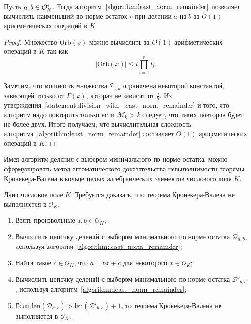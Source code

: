 \documentclass[_00_dissertation.tex]{subfiles}
\begin{document}
\begin{proposition}
    Пусть $a, b \in \mathcal{O}_K^{*}$.
    Тогда алгоритм~$\ref{algorithm:least_norm_remainder}$ позволяет вычислить наименьший по норме остаток $r$ при делении $a$ на $b$ за $O(1)$ арифметических операций в $K$.
\end{proposition}
\begin{proof}
    Множество $\textrm{Orb}(x)$ можно вычислить за $O(1)$ арифметических операций в $K$ так как
    \begin{equation*}
        |\textrm{Orb}(x)| \le l\prod\limits_{i=1}^r l_i.
    \end{equation*}

    Заметим, что мощность множества $\mathcal{I}_{z, k}$ ограничена некоторой константой, зависящей только от $\Gamma(k)$, которая не зависит от $\frac{a}{b}$.
    Из утверждения~\ref{statement:division_with_least_norm_remainder} и того, что алгоритм надо повторить только если $\mathcal{M}_k > k$ следует, что таких повторов будет не более двух.
    Итого получаем, что вычислительная сложность алгоритма~\ref{algorithm:least_norm_remainder} составляет $O(1)$ арифметических операций в $K$.
\end{proof}


Имея алгоритм деления с выбором минимального по норме остатка, можно сформулировать метод автоматического доказательства невыполнимости теоремы Кронекера-Валена в кольце целых алгебраических элементов числового поля $K$.

\begin{algorithm}\label{algorithm:kronecker_vahlen_common}
    Дано числовое поле $K$.
    Требуется доказать, что теорема Кронекера-Валена не выполняется в $\mathcal{O}_K$.
    
    \begin{enumerate}
        \item Взять произвольные $a, b \in \mathcal{O}_K$;

        \item Вычислить цепочку делений с выбором минимального по норме остатка $\mathcal{D}_{a, b}$, используя алгоритм~\ref{algorithm:least_norm_remainder};

        \item Найти такое $c \in \mathcal{O}_K$, что $a = bx + c$ для некоторого $x \in \mathcal{O}_K$;

        \item Вычислить цепочку делений с выбором минимального по норме остатка $\mathcal{D}'_{b,c}$, используя алгоритм~\ref{algorithm:least_norm_remainder};

        \item Если $\textrm{len}(\mathcal{D}_{a, b}) > \textrm{len}(\mathcal{D}'_{b, c}) + 1$, то теорема Кронекера-Валена не выполняется в $\mathcal{O}_K$.
    \end{enumerate}
\end{algorithm}
\end{document}
